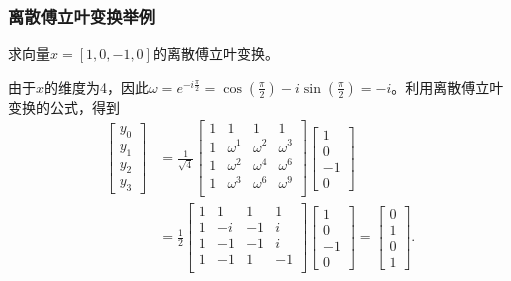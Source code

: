 \documentclass[10pt]{beamer}
\begin{document}
\begin{frame}
\frametitle{离散傅立叶变换举例}
\begin{example}
求向量$x = [1,0,-1,0]$的离散傅立叶变换。
\end{example}
由于$x$的维度为4，因此$\omega = e^{-i \frac{\pi}{2}} = \cos(\frac{\pi}{2}) - i \sin(\frac{\pi}{2}) = -i$。利用离散傅立叶变换的公式，得到
\begin{align*}
\left[ \begin{array}{c}
     y_0 \\ y_1 \\y_2  \\ y_{3}  \end{array} \right]
&= \frac{1}{\sqrt{4}} \left[ \begin{array}{cccc}
     1    & 1 & 1  & 1  \\
     1    &  \omega^1 &  \omega^2 &  \omega^{3}  \\
     1    &  \omega^2 &  \omega^4 & \omega^{6}  \\
     1    &  \omega^3 &  \omega^6 & \omega^{9}  \\                 
            \end{array} \right] 
\left[ \begin{array}{c}
     1 \\ 0 \\ -1 \\ 0  \end{array} \right] \nonumber \\
&= \frac{1}{2} \left[ \begin{array}{cccc}
     1    & 1 & 1  & 1  \\
     1    &  -i &  -1 &  i \\
     1    & -1 &  -1 & i  \\
     1    & -1 & 1  & -1  \\                 
            \end{array} \right] 
\left[ \begin{array}{c}
     1 \\ 0 \\ -1 \\ 0  \end{array} \right] 
= \left[ \begin{array}{c}
     0 \\ 1 \\ 0 \\ 1  \end{array} \right]  .
\end{align*}
\end{frame}
\end{document}
